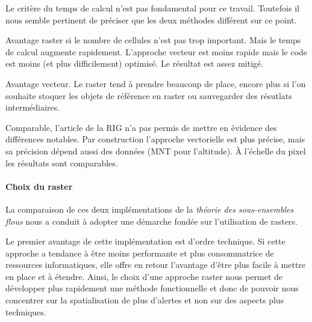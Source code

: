 
Le critère du temps de calcul n'est pas fondamental pour ce
travail. Toutefois il nous semble pertinent de préciser que les deux
méthodes différent sur ce point.

Avantage raster si le nombre de cellules n'est pas trop
important. Mais le temps de calcul augmente rapidement. L'approche
vecteur est moins rapide mais le code est moins (et plus
difficilement) optimisé. Le résultat est assez mitigé.


Avantage vecteur. Le raster tend à prendre beaucoup de place, encore
plus si l'on souhaite stoquer les objets de référence en raster ou
sauvegarder des résutlats intermédiaires.


Comparable, l'article de la RIG n'a pas permis de mettre en évidence
des différences notables. Par construction l'approche vectorielle est
plus précise, mais sa précision dépend aussi des données (MNT pour
l'altitude). À l'échelle du pixel les résultats sont comparables.



\paragraph{Choix du raster}


La comparaison de ces deux implémentations de la \emph{théorie des
  sous-ensembles flous} nous a conduit à adopter une démarche fondée sur
l'utilisation de rasters.




Le premier avantage de cette implémentation est d'ordre technique. Si
cette approche a tendance à être moins performante et plus
consommatrice de ressources informatiques, elle offre en retour
l'avantage d'être plus facile à mettre en place et à étendre. Ainsi,
le choix d'une approche raster nous permet de développer plus
rapidement une méthode fonctionnelle et donc de pouvoir nous
concentrer sur la spatialisation de plus d'alertes et non sur des
aspects plus techniques.

